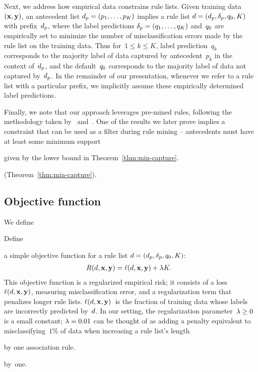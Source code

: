 Next, we address how empirical data constrains rule lists.
%
Given training data~${(\mathbf{x}, \mathbf{y})}$,
an antecedent list ${d_p = (p_1, \dots, p_K)}$
implies a rule list ${{d} = (d_p, \delta_p, q_0, K)}$
with prefix~$d_p$, where the label predictions
${\delta_p = (q_1, \dots, q_K)}$ and~$q_0$ are empirically set
to minimize the number of misclassification errors made by
the rule list on the training data.
%
Thus for~${1 \le k \le K}$, label prediction~$q_k$ corresponds to the
majority label of data captured by antecedent~$p_k$ in the context of~$d_p$,
and the default~$q_0$ corresponds to the majority label of data
not captured by~$d_p$.
%
In the remainder of our presentation, whenever we refer to a rule list with a
particular prefix, we implicitly assume these empirically determined label predictions.

Finally, we note that our approach leverages pre-mined rules,
following the methodology taken by~\citet{LethamRuMcMa15} and~\citet{YangRuSe16}.
%
One of the results we later prove implies a constraint
that can be used as a filter during rule mining --
antecedents must have at least some minimum support
\begin{arxiv}
given by the lower bound in Theorem~\ref{thm:min-capture}.
\end{arxiv}
\begin{kdd}
(Theorem~\ref{thm:min-capture}).
\end{kdd}


\subsection{Objective function}
\label{sec:objective}

\begin{arxiv}
We define
\end{arxiv}
\begin{kdd}
Define
\end{kdd}
a simple objective function for a rule list ${{d} = (d_p, \delta_p, q_0, K)}$:
\begin{align}
R({d}, \mathbf{x}, \mathbf{y}) = \ell({d}, \mathbf{x}, \mathbf{y}) + {\lambda} K.
\label{eq:objective}
\end{align}
This objective function is a regularized empirical risk;
it consists of a loss~$\ell({d}, \mathbf{x}, \mathbf{y})$, measuring misclassification error,
and a regularization term that penalizes longer rule lists.
%
$\ell({d}, \mathbf{x}, \mathbf{y})$~is the fraction of training data whose labels are
incorrectly predicted by~${d}$.
%
In our setting, the regularization parameter~${{\lambda} \ge 0}$ is a small constant;
\eg ${{\lambda} = 0.01}$ can be thought of as adding a penalty equivalent to misclassifying~$1\%$
of data when increasing a rule list's length
\begin{arxiv}
by one association rule.
\end{arxiv}
\begin{kdd}
by~one.
\end{kdd}
%

